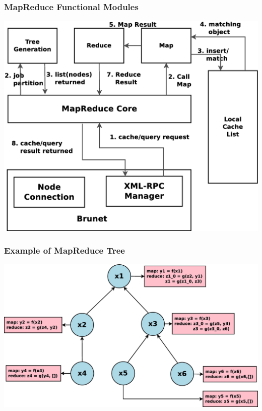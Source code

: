 \documentclass[red]{beamer}
\begin{document}
\begin{frame}
\frametitle{MapReduce Functional Modules}
\begin{center}
\includegraphics[scale=0.2]{figs/mapreduce_query_system}
\end{center}
\end{frame}

\begin{frame}
\frametitle{Example of MapReduce Tree}
\begin{center}
\includegraphics[scale=0.2]{figs/mapreduce_tree}
\end{center}
\end{frame}
\end{document}
